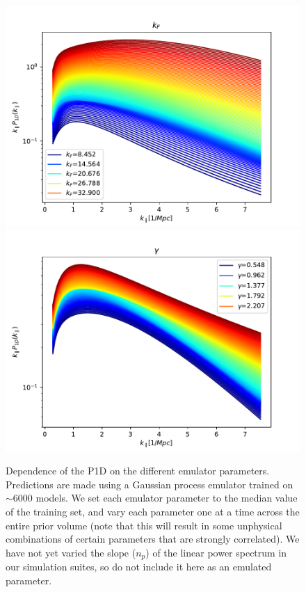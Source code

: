 \documentclass[]{article}
\begin{document}
\begin{figure}[h]
    \includegraphics[scale=0.47]{Figures/256_kF_Mpc.pdf}
    \includegraphics[scale=0.47]{Figures/256_gamma.pdf}
    \caption{Dependence of the P1D on the different emulator parameters. Predictions are 
    made using a Gaussian process emulator trained on $\sim6000$ models. We set each
    emulator parameter to the median value of the training set, and vary each parameter
    one at a time across the entire prior volume (note that this will result in some
    unphysical combinations of certain parameters that are strongly correlated).
    We have not yet varied the slope ($n_p$) of the linear power spectrum in 
    our simulation suites, so do not include it here as an emulated parameter.}
\end{figure}
\end{document}

